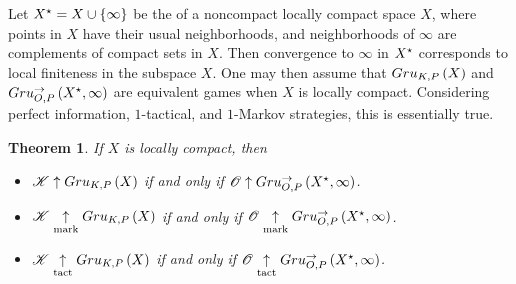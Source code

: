 \documentclass{amsart}
\newtheorem{theorem}{Theorem}[section]
\theoremstyle{definition}
\begin{document}
Let $X^\star=X\cup\{\infty\}$ be the 
of a noncompact locally compact space $X$, where points in $X$ have their
usual neighborhoods, and neighborhoods of $\infty$ are complements of
compact sets in $X$. Then convergence to $\infty$ in $X^\star$
corresponds to local finiteness in the subspace $X$. One may then assume that
$Gru_{K,P}\left({X}\right)$ and $Gru_{O,P}^{\to}\left({X^\star},{\infty}\right)$ are equivalent games
when $X$ is locally compact.
Considering perfect information, $1$-tactical, and $1$-Markov strategies, this
is essentially true.

\begin{theorem}
  If $X$ is locally compact, then
    \begin{itemize}
      \item $\mathscr{K}\uparrow Gru_{K,P}\left({X}\right)$ if and only if
        $\mathscr{O}\uparrow Gru_{O,P}^{\to}\left({X^\star},{\infty}\right)$.
      \item $\mathscr{K}\underset{\text{mark}}{\uparrow}Gru_{K,P}\left({X}\right)$ if and only if
        $\mathscr{O}\underset{\text{mark}}{\uparrow}Gru_{O,P}^{\to}\left({X^\star},{\infty}\right)$.
      \item $\mathscr{K}\underset{\text{tact}}{\uparrow}Gru_{K,P}\left({X}\right)$ if and only if
        $\mathscr{O}\underset{\text{tact}}{\uparrow}Gru_{O,P}^{\to}\left({X^\star},{\infty}\right)$.
    \end{itemize}
\end{theorem}
\end{document}
